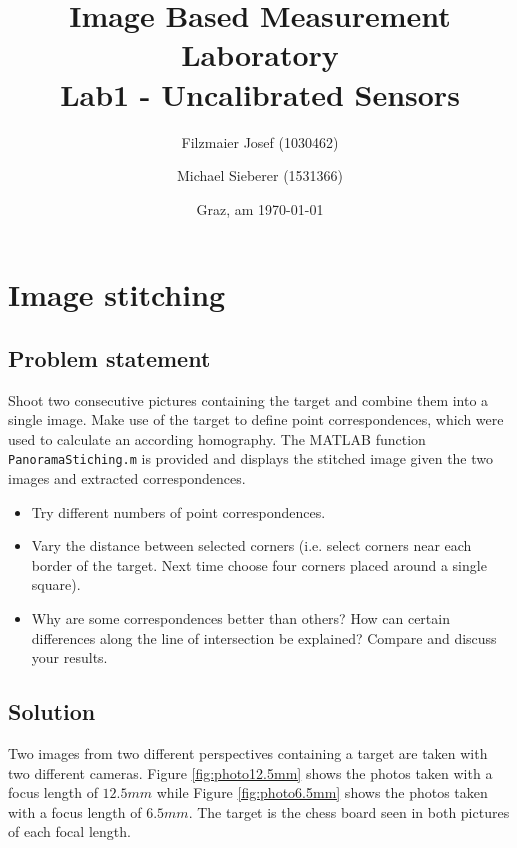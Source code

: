 \documentclass[
a4paper,     %
12pt         %
]{scrartcl}  %
\title{Image Based Measurement Laboratory\\\vspace{1cm}\Large{Lab1 - Uncalibrated Sensors}}
\author{Filzmaier Josef (1030462) \and
Michael Sieberer (1531366)}
\date{Graz, am \today{}}
\begin{document}

 \maketitle

 \tableofcontents
 \newpage

\section{Image stitching}

\subsection{Problem statement}

Shoot two consecutive pictures containing the target and combine them into a single image. Make use of the
target to define point correspondences, which were used to calculate an according homography. The MATLAB
function \texttt{PanoramaStiching.m} is provided and displays the stitched image given the two images and extracted
correspondences.

\begin{itemize}
 \item Try different numbers of point correspondences.
 \item Vary the distance between selected corners (i.e. select corners near each border of the target. Next time choose four corners placed around a single square).
 \item Why are some correspondences better than others? How can certain differences along the line of intersection be explained? Compare and discuss your results.
\end{itemize}

\subsection{Solution}

Two images from two different perspectives containing a target are taken with two different cameras.
Figure \ref{fig:photo12.5mm} shows the photos taken with a focus length of $12.5mm$ while Figure \ref{fig:photo6.5mm} shows the photos taken with a focus length of $6.5mm$.
The target is the chess board seen in both pictures of each focal length.
\end{document}
